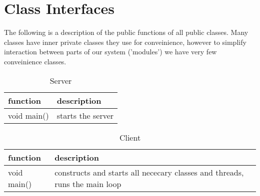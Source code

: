 \section{Class Interfaces}
The following is a description of the public functions of all public classes.
Many classes have inner private classes they use for conveinience, however to
simplify interaction between parts of our system ('modules') we have very few
conveinience classes.


\begin{table}[h]
    \centering
    \begin{tabular}{p{2cm}p{3cm}}
    function    & description\\ \hline
    void main() & starts the server\\
    \end{tabular}
    \caption{Server}
\end{table}

\begin{table}[h]
    \centering
    \begin{tabular}{p{2cm}p{9cm}}
    function    & description\\ \hline
    void main() & constructs and starts all nececary classes and threads, runs the main loop\\
    \end{tabular}
    \caption{Client}
\end{table}

